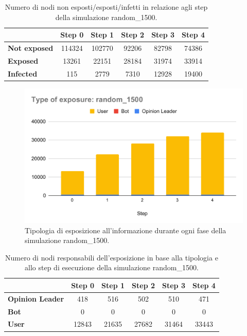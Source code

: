         \begin{table}[H]
            \centering
            \begin{tabular}{l|c|c|c|c|c}
                        & Step 0 & Step 1 & Step 2 & Step 3 & Step 4 \\ \hline
            \textbf{Not exposed} & 114324 & 102770 & 92206  & 82798  & 74386  \\ \hline
            \textbf{Exposed}     & 13261  & 22151  & 28184  & 31974  & 33914  \\ \hline
            \textbf{Infected}    & 115    & 2779   & 7310   & 12928  & 19400  \\
            \end{tabular}
            \caption{Numero di nodi non esposti/esposti/infetti in relazione agli step della simulazione random\_1500.}
        \end{table}
        
        \begin{figure}[H]
            \centering
            \includegraphics[width=.7\textwidth]{resources/charts/Type of exposure_ random_1500.pdf}
            \caption{Tipologia di esposizione all'informazione durante ogni fase della simulazione random\_1500.}
        \end{figure}
        
        \begin{table}[H]
            \centering
            \begin{tabular}{l|c|c|c|c|c}
                           & Step 0 & Step 1 & Step 2 & Step 3 & Step 4 \\ \hline
            \textbf{Opinion Leader} & 418    & 516    & 502    & 510    & 471    \\ \hline
            \textbf{Bot}            & 0      & 0      & 0      & 0      & 0      \\ \hline
            \textbf{User}           & 12843  & 21635  & 27682  & 31464  & 33443  \\
            \end{tabular}
            \caption{Numero di nodi responsabili dell'esposizione in base alla tipologia e allo step di esecuzione della simulazione random\_1500.}
        \end{table}

